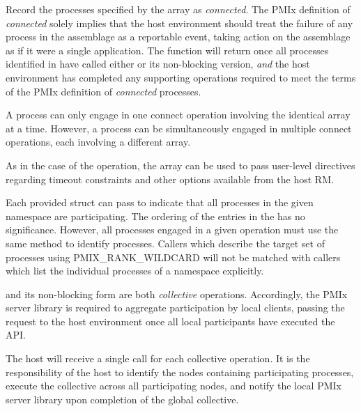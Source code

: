 
\optattrend

\descr

Record the processes specified by the  array as \textit{connected}.
The \ac{PMIx} definition of \textit{connected} solely implies that the host environment should treat the failure of any process in the assemblage as a reportable event, taking action on the assemblage as if it were a single application.
The function will return once all processes identified in  have called either  or its non-blocking version, \textit{and} the host environment has completed any supporting operations required to meet the terms of the \ac{PMIx} definition of \textit{connected} processes.

A process can only engage in one connect operation involving the identical  array at a time.
However, a process can be simultaneously engaged in multiple connect operations, each involving a different  array.

As in the case of the  operation, the  array can be used to pass user-level directives regarding timeout constraints and other options available from the host \ac{RM}.

Each provided  struct can pass  to indicate that all processes in the given namespace are participating.
The ordering of the entries in the  has no significance.  However, all processes engaged in a given
operation must use the same method to identify processes.  Callers which describe
the target set of processes using PMIX_RANK_WILDCARD will not be matched with
callers which list the individual processes of a namespace explicitly.

\adviceimplstart
{} and its non-blocking form are both \emph{collective} operations. Accordingly, the \ac{PMIx} server library is required to aggregate participation by local clients, passing the request to the host environment once all local participants have executed the \ac{API}.
\adviceimplend

\advicermstart
The host will receive a single call for each collective operation. It is the responsibility of the host to identify the nodes containing participating processes, execute the collective across all participating nodes, and notify the local \ac{PMIx} server library upon completion of the global collective.
\advicermend


